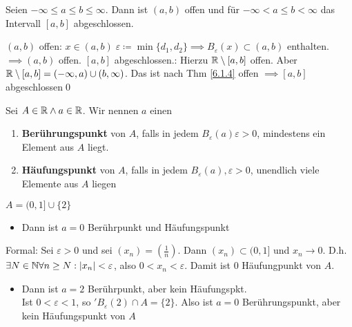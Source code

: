 \begin{sublemma}
	Seien $ -\infty \leq a \leq b \leq \infty $. Dann ist $ (a,b) $ offen und für $ -\infty < a \leq b < \infty $ das Intervall $ [a,b] $ abgeschlossen.
\end{sublemma}

\begin{subproof*}
	$ (a,b) $ offen: $ x \in  (a, b) \; \varepsilon \coloneqq \min \{d_1, d_2\} \implies B_{\varepsilon}(x) \subset (a, b) $ enthalten.\\
	$ \implies (a, b) $ offen. $ [a, b] $ abgeschlossen.: Hierzu $ \mathbb{R} \setminus [a, b] $ offen. Aber $  \mathbb{R} \setminus [a, b] = (-\infty, a) \cup (b, \infty) $. Das ist nach Thm \ref{6.1.4} offen $ \implies [a, b] $ abgeschlossen\qed
\end{subproof*}

\begin{subdefinition}
	Sei $ A \in  \mathbb{R} \wedge a \in \mathbb{R} $. Wir nennen $ a $ einen
	\begin{enumerate}[label=\roman*)]
		\item \textbf{Berührungspunkt} von $ A $, falls in jedem $ B_{\varepsilon}(a) \varepsilon > 0 $, mindestens ein Element aus $ A $ liegt.
		\item \textbf{Häufungspunkt} von $ A $, falls in jedem $ B_{\varepsilon}(a), \varepsilon > 0 $, unendlich viele Elemente aus $ A $ liegen
	\end{enumerate}
\end{subdefinition}

\begin{subexample}
	$ A = (0, 1] \cup \{2\} $
	\begin{itemize}
		\item Dann ist $ a=0 $ Berührpunkt und Häufungspunkt
	\end{itemize}
	Formal: Sei $ \varepsilon > 0 $ und sei $ (x_n) = (\frac{1}{n}) $. Dann $ (x_n) \subset (0, 1] $ und $ x_n \to 0 $. D.h. $ \exists N \in  \mathbb{N} \forall n \geq N: |x_n| < \varepsilon $, also $ 0 < x_n < \varepsilon $. Damit ist 0 Häufungpunkt von $ A $.
	\begin{itemize}
		\item Dann ist $ a=2 $ Berührpunkt, aber kein Häufungspkt.\\
			Ist $ 0< \varepsilon < 1 $, so $ 'B_{\varepsilon}(2) \cap A = \{2\} $. Also ist $ a = 0 $ Berührungspunkt, aber kein Häufungspunkt von $ A $
	\end{itemize}
\end{subexample}

